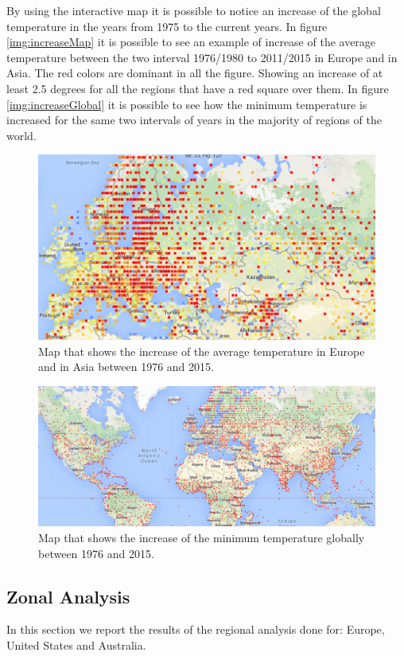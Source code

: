 \documentclass{vldb}
\begin{document}
By using the interactive map it is possible to notice an increase of the global temperature in the years from 1975 to the current years. In figure \ref{img:increaseMap} it is possible to see an example of increase of the average temperature between the two interval 1976/1980 to 2011/2015 in Europe and in Asia. The red colors are dominant in all the figure. Showing an increase of at least 2.5 degrees for all the regions that have a red square over them.
In figure \ref{img:increaseGlobal} it is possible to see how the minimum temperature is increased for the same two intervals of years in the majority of regions of the world.

\begin{figure}[tbh]
\includegraphics[width=1\linewidth]{increaseEurope}
\caption{Map that shows the increase of the average temperature in Europe and in Asia between 1976 and 2015.}
\label{fig:interface}
\end{figure}

\begin{figure}[tbh]
\includegraphics[width=1\linewidth]{increaseGlobal}
\caption{Map that shows the increase of the minimum temperature globally between 1976 and 2015.}
\label{fig:interface}
\end{figure}

\subsection{Zonal Analysis}
In this section we report the results of the regional analysis done for: Europe, United States and Australia.
\end{document}
